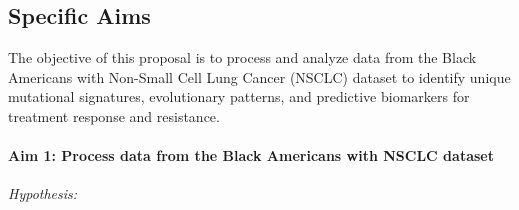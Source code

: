 
\newcommand{\SpecificAimOne}{Process data from the Black Americans with NSCLC dataset}
\newcommand{\SpecificAimOneA}{Perform data cleaning and preprocessing by removing low-quality sequences and aligning the reads to the reference genome}
\newcommand{\SpecificAimOneB}{Normalize the data to account for batch effects and other technical variances}
\newcommand{\SpecificAimOneC}{Identify mutational signatures using established bioinformatics tools and compare them with known signatures from other populations to identify unique patterns}

\newcommand{\SpecificAimTwo}{Conduct evolutionary analysis to establish a baseline for subsequent comparison}
\newcommand{\SpecificAimTwoA}{Apply phylogenetic analysis to understand the clonal evolution of tumors in this dataset}
\newcommand{\SpecificAimTwoB}{Integrate clinical data to correlate mutational patterns with treatment outcomes}
\newcommand{\SpecificAimTwoC}{Document the identified key mutation timings and evolutionary patterns as the baseline}

\newcommand{\SpecificAimThree}{Develop innovative methods to map the paths of mutational processes throughout clonal evolution with improved mutation-time resolution}
\newcommand{\SpecificAimThreeA}{Establish high-resolution mutation-time techniques to precisely time mutational signature activities}
\newcommand{\SpecificAimThreeB}{Use refined techniques as a starting point for improving the accuracy of timing driver mutations in the evolutionary history of cancer}
\newcommand{\SpecificAimThreeC}{Develop and distribute user-friendly software tools to the research community}



\subsection*{Specific Aims}

The objective of this proposal is to process and analyze data from the Black Americans with Non-Small Cell Lung Cancer (NSCLC) dataset to identify unique mutational signatures, evolutionary patterns, and predictive biomarkers for treatment response and resistance. 

\paragraph*{Aim 1: \SpecificAimOne} 
\emph{Hypothesis:}

